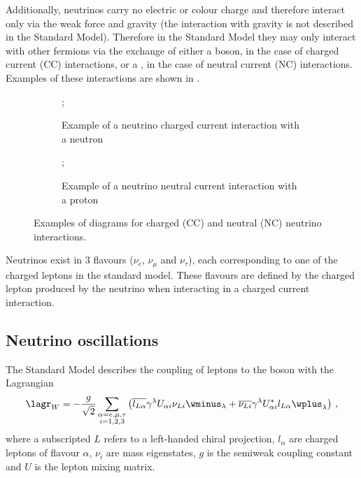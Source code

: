 Additionally, neutrinos carry no electric or colour charge and therefore interact only via the weak force and gravity (the interaction with gravity is not described in the Standard Model).
Therefore in the Standard Model they may only interact with other fermions via the exchange of either a \wpm boson, in the case of charged current (CC) interactions, or a \zboson, in the case of neutral current (NC) interactions.
Examples of these interactions are shown in .

\begin{figure}[h]
  \centering
  \begin{subfigure}[t]{.49\textwidth}
    \centering
    ;
    \caption{Example of a neutrino charged current interaction with a neutron}
  \end{subfigure}
  \hfill
  \begin{subfigure}[t]{.49\textwidth}
    \centering
    ;    
    \caption{Example of a neutrino neutral current interaction with a proton}
  \end{subfigure}
  \caption[Examples of diagrams for charged (CC) and neutral (NC) neutrino interactions.]{Examples of diagrams for charged (CC) and neutral (NC) neutrino interactions.}
  \label{fig:nuIntEx}
\end{figure}

Neutrinos exist in 3 flavours ($\nu_{e}$, $\nu_{\mu}$ and $\nu_{\tau}$), each corresponding to one of the charged leptons in the standard model.
These flavours are defined by the charged lepton produced by the neutrino when interacting in a charged current interaction.

\subsection{Neutrino oscillations}
\label{sec:theory:theory:oscillations}


The Standard Model describes the coupling of leptons to the \wboson boson with the Lagrangian
\begin{equation}
  \lagr_{W} = - \frac{g}{\sqrt{2}} \sum_{\substack{\alpha = e, \mu, \tau \\ i = 1, 2, 3}}
  \left( \overline{l_{L\alpha}} \gamma^{\lambda} U_{\alpha i} \nu_{Li} \wminus_{\lambda} +
  \overline{\nu_{Li}} \gamma^{\lambda} U^{*}_{\alpha i} l_{L\alpha} \wplus_{\lambda} \right) \, ,
  \label{eq:lagr}
\end{equation}
where a subscripted $L$ refers to a left-handed chiral projection, $l_{\alpha}$ are charged leptons of flavour $\alpha$, $\nu_{i}$ are mass eigenstates, $g$ is the semiweak coupling constant and $U$ is the lepton mixing matrix.

